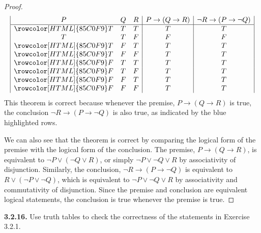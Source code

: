 \documentclass[12pt]{amsart}
\newenvironment{statement}[1]{\smallskip\noindent\color[rgb]{.6627, .3529, .6314} {\bf #1.}}{}
\theoremstyle{definition}
\theoremstyle{remark}
\begin{document}
\begin{proof}
\begin{equation*}
	\begin{array}{| c c c | c | c |}
		P & Q & R & P \rightarrow (Q \rightarrow R) & \neg R \rightarrow (P \rightarrow \neg Q) \\
		\hline
		\rowcolor[HTML]{85C0F9} T & T & T & T & T \\
		T & T & F & F & F \\
		\rowcolor[HTML]{85C0F9} T & F & T & T & T \\
		\rowcolor[HTML]{85C0F9} T & F & F & T & T \\
		\rowcolor[HTML]{85C0F9} F & T & T & T & T \\
		\rowcolor[HTML]{85C0F9} F & T & F & T & T \\
		\rowcolor[HTML]{85C0F9} F & F & T & T & T \\
		\rowcolor[HTML]{85C0F9} F & F & F & T & T \\
	\end{array}
\end{equation*}
This theorem is correct because whenever the premise, $P \rightarrow (Q \rightarrow R)$ is true, the conclusion $\neg R \rightarrow (P \rightarrow \neg Q)$ is also true, as indicated by the blue highlighted rows.

We can also see that the theorem is correct by comparing the logical form of the premise with the logical form of the conclusion.
The premise, $P \rightarrow (Q \rightarrow R)$, is equivalent to $\neg P \vee (\neg Q \vee R)$, or simply $\neg P \vee \neg Q \vee R$ by associativity of disjunction.
Similarly, the conclusion, $\neg R \rightarrow (P \rightarrow \neg Q)$ is equivalent to $R \vee (\neg P \vee \neg Q)$, which is equivalent to $\neg P \vee \neg Q \vee R$ by associativity and commutativity of disjunction.
Since the premise and conclusion are equivalent logical statements, the conclusion is true whenever the premise is true.
\end{proof}


\begin{statement}{3.2.16}
Use truth tables to check the correctness of the statements in Exercise 3.2.1.
\end{statement}
\end{document}
